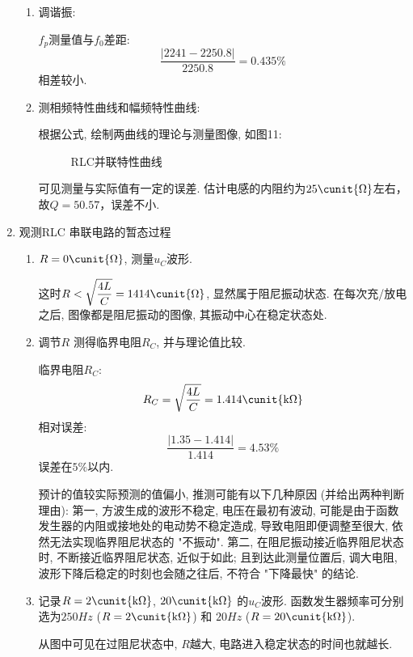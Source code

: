 \documentclass[11pt]{article}
\begin{document}
\begin{enumerate}
\begin{enumerate}
\item 调谐振:

$f_p$测量值与$f_0$差距:
\[
    \frac{|2241-2250.8|}{2250.8} = 0.435\%
\]
相差较小.

\item 测相频特性曲线和幅频特性曲线:

根据公式, 绘制两曲线的理论与测量图像, 如图11:

\begin{figure}[H]
    \centering
    \caption{RLC并联特性曲线}
\end{figure}

可见测量与实际值有一定的误差. 估计电感的内阻约为$25\cunit{\Omega}$左右，故$Q=50.57$，误差不小.

\end{enumerate}


\item 观测RLC 串联电路的暂态过程


\begin{enumerate}

    \item $R=0 \cunit{\Omega}$, 测量$u_C$波形. 
    
    这时$\displaystyle R < \sqrt{\frac{4L}{C}} = 1414\cunit{\Omega}$, 显然属于阻尼振动状态. 在每次充/放电之后, 图像都是阻尼振动的图像, 其振动中心在稳定状态处.
    
    \item 调节$R$ 测得临界电阻$R_C$, 并与理论值比较. 
    
    临界电阻$R_C$:
    \[
        R_C = \sqrt{\frac{4L}{C}}= 1.414\cunit{\mathrm{k}\Omega} 
    \]
    相对误差:
    \[
        \frac{|1.35-1.414|}{1.414} = 4.53\%
    \]
    误差在$5\%$以内.

    预计的值较实际预测的值偏小, 推测可能有以下几种原因 (并给出两种判断理由): 第一, 方波生成的波形不稳定, 电压在最初有波动, 可能是由于函数发生器的内阻或接地处的电动势不稳定造成, 导致电阻即便调整至很大, 依然无法实现临界阻尼状态的 "不振动". 第二, 在阻尼振动接近临界阻尼状态时, 不断接近临界阻尼状态, 近似于如此; 且到达此测量位置后, 调大电阻, 波形下降后稳定的时刻也会随之往后, 不符合 "下降最快" 的结论.
    
    \item 记录$R=2 \cunit{\mathrm{k}\Omega}$, $20 \cunit{\mathrm{k}\Omega}$ 的$u_C$波形. 函数发生器频率可分别选为$250 \unit{Hz}$ ($R=2 \cunit{\mathrm{k}\Omega}$) 和 $20 \unit{Hz}$ ($R=20 \cunit{\mathrm{k}\Omega}$). 
    
    从图中可见在过阻尼状态中, $R$越大, 电路进入稳定状态的时间也就越长.

    \end{enumerate}

\end{enumerate}
\end{document}
